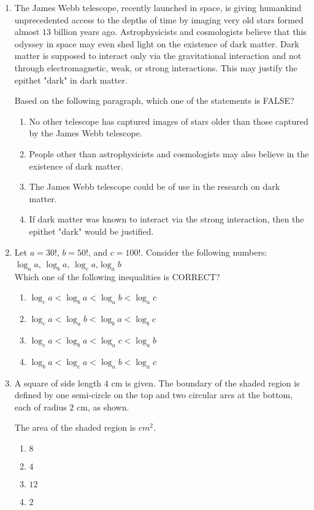 \documentclass[journal,12pt,onecolumn]{IEEEtran}
\theoremstyle{remark}
\begin{document}
\begin{enumerate}
    \item The James Webb telescope, recently launched in space, is giving humankind unprecedented access to the depths of time by imaging very old stars formed almost $13$ billion years ago. Astrophysicists and cosmologists believe that this odyssey in space may even shed light on the existence of dark matter. Dark matter is supposed to interact only via the gravitational interaction and not through electromagnetic, weak, or strong interactions. This may justify the epithet "dark" in dark matter.

     Based on the following paragraph, which one of the statements is FALSE? 

    \begin{enumerate}
        \item No other telescope has captured images of stars older than those captured by the James Webb telescope.
        \item People other than astrophysicists and cosmologists may also believe in the existence of dark matter.
        \item The James Webb telescope could be of use in the research on dark matter.
        \item If dark matter was known to interact via the strong interaction, then the epithet "dark" would be justified.
    \end{enumerate}

    \item Let $a = 30!$, $b = 50!$, and $c = 100!$. Consider the following numbers:\\ 
    $\log_a a$, $\log_b a$, $\log_c a$,$\log_a b$\\
    Which one of the following inequalities is CORRECT?
    \begin{enumerate}
        \item $\log_c a < \log_b a < \log_a b < \log_a c$
        \item $\log_c a < \log_a b < \log_b a < \log_b c$
        \item $\log_c a < \log_b a < \log_a c < \log_a b$
        \item $\log_b a < \log_c a < \log_a b < \log_a c$
    \end{enumerate}

    \item A square of side length $4$ cm is given. The boundary of the shaded region is defined by one semi-circle on the top and two circular arcs at the bottom, each of radius $2$ cm, as shown.
      \begin{figure}[H]
        \centering
    \end{figure}
    The area of the shaded region is {\underline{\hspace{2cm}}}$cm^2$.
    \begin{enumerate}
        \item $8$
        \item $4$
        \item $12$ 
        \item $2$
    \end{enumerate}



\end{enumerate}
\end{document}
